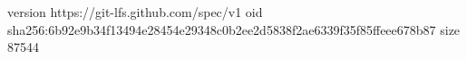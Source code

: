 version https://git-lfs.github.com/spec/v1
oid sha256:6b92e9b34f13494e28454e29348c0b2ee2d5838f2ae6339f35f85ffeee678b87
size 87544
